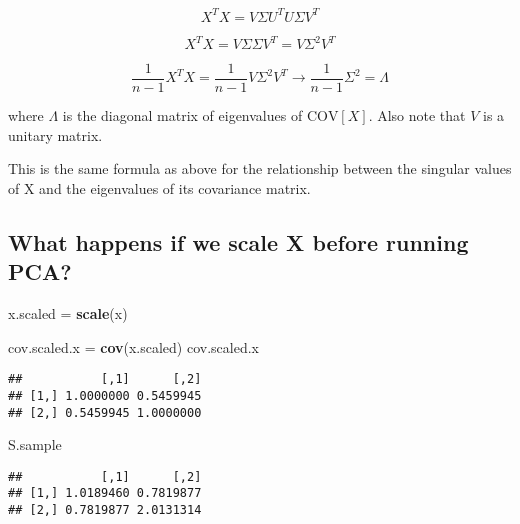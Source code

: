 \documentclass[]{article}
\newenvironment{Shaded}{\begin{snugshade}}{\end{snugshade}}
\newcommand{\KeywordTok}[1]{\textcolor[rgb]{0.13,0.29,0.53}{\textbf{{#1}}}}
\newcommand{\StringTok}[1]{\textcolor[rgb]{0.31,0.60,0.02}{{#1}}}
\newcommand{\NormalTok}[1]{{#1}}
\begin{document}
\begin{equation}
X^TX = V \Sigma U^TU \Sigma V^T
\end{equation}

\begin{equation}
X^TX = V \Sigma \Sigma V^T = V \Sigma^2 V^T
\end{equation}

\begin{equation}
\frac{1}{n-1}X^TX = \frac{1}{n-1} V \Sigma^2 V^T \rightarrow \frac{1}{n-1} \Sigma^2 = \Lambda
\end{equation}

where \(\Lambda\) is the diagonal matrix of eigenvalues of
\(\text{COV} \left [ X \right ]\). Also note that \(V\) is a unitary
matrix.

This is the same formula as above for the relationship between the
singular values of X and the eigenvalues of its covariance matrix.

\subsection{What happens if we scale X before running
PCA?}\label{what-happens-if-we-scale-x-before-running-pca}

\begin{Shaded}
\begin{Highlighting}[]
\NormalTok{x.scaled =}\StringTok{ }\KeywordTok{scale}\NormalTok{(x)}

\NormalTok{cov.scaled.x =}\StringTok{ }\KeywordTok{cov}\NormalTok{(x.scaled)}
\NormalTok{cov.scaled.x}
\end{Highlighting}
\end{Shaded}

\begin{verbatim}
##           [,1]      [,2]
## [1,] 1.0000000 0.5459945
## [2,] 0.5459945 1.0000000
\end{verbatim}

\begin{Shaded}
\begin{Highlighting}[]
\NormalTok{S.sample}
\end{Highlighting}
\end{Shaded}

\begin{verbatim}
##           [,1]      [,2]
## [1,] 1.0189460 0.7819877
## [2,] 0.7819877 2.0131314
\end{verbatim}
\end{document}
